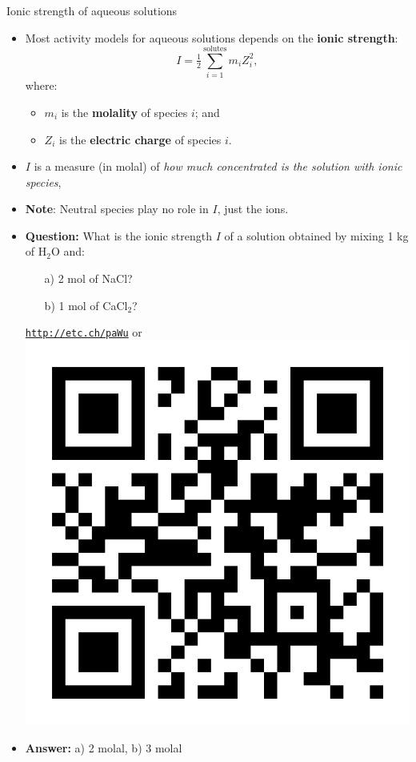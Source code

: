\begin{frame}{Ionic strength of aqueous solutions}
%
\lcol
\begin{itemize}
\item Most activity models for aqueous solutions depends on the  \alert{\textbf{ionic strength}}:
\[
\boxed{I=\tfrac{1}{2}\sum_{i=1}^{\text{solutes}}m_{i}Z_{i}^{2}},
\]
where:
\begin{itemize}
\item $m_{i}$ is the \textbf{molality} of species $i$; and
\item $Z_{i}$ is the \textbf{electric charge }of species $i$.
\end{itemize}
\pause
\item $I$ is a measure (in molal) of \emph{how much concentrated is the solution with ionic
species}, 
\item \textbf{Note}: \alert{Neutral species} play no role in $I$, just the ions.
\end{itemize}
\rcol
\begin{itemize}
	\pause
\item \alert{\textbf{Question:}} What is the ionic strength $I$ of a solution obtained
by mixing 1 kg of H$_{2}$O and:
\begin{itemize}
\item[a)] 2 mol of NaCl?
\item[b)] 1 mol of CaCl$_{2}$?
\end{itemize}
\vskip 5pt
\begin{center}
\href{http://etc.ch/paWu}{\textcolor{indigo(dye)}{\tt http://etc.ch/paWu}} or 
\includegraphics[height=0.45\columnwidth]{figures/activity-models/poll-ionic-strength.png}
\end{center}
\hiddenpause
\item \textbf{Answer:}
a) 2 molal, 
b) 3 molal
\end{itemize}
\ecol
\end{frame}
%
